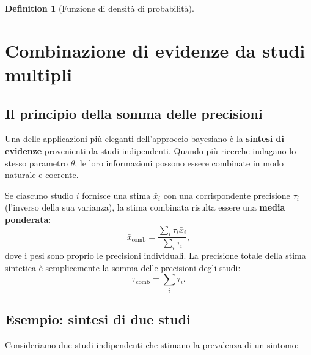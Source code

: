 \documentclass[
  letterpaper,
  DIV=11,
  numbers=noendperiod,
  oneside]{scrreprt}
\newenvironment{Shaded}{\begin{snugshade}}{\end{snugshade}}
\newcommand{\AttributeTok}[1]{\textcolor[rgb]{0.40,0.45,0.13}{#1}}
\newcommand{\CommentTok}[1]{\textcolor[rgb]{0.37,0.37,0.37}{#1}}
\newcommand{\DecValTok}[1]{\textcolor[rgb]{0.68,0.00,0.00}{#1}}
\newcommand{\FloatTok}[1]{\textcolor[rgb]{0.68,0.00,0.00}{#1}}
\newcommand{\FunctionTok}[1]{\textcolor[rgb]{0.28,0.35,0.67}{#1}}
\newcommand{\NormalTok}[1]{\textcolor[rgb]{0.00,0.23,0.31}{#1}}
\newcommand{\OtherTok}[1]{\textcolor[rgb]{0.00,0.23,0.31}{#1}}
\newcommand{\SpecialCharTok}[1]{\textcolor[rgb]{0.37,0.37,0.37}{#1}}
\newcommand{\StringTok}[1]{\textcolor[rgb]{0.13,0.47,0.30}{#1}}
\theoremstyle{definition}
\theoremstyle{plain}
\theoremstyle{definition}
\newtheorem{definition}{Definition}[chapter]
\theoremstyle{remark}
\begin{document}
\begin{definition}[Funzione di densità di
probabilità]
\section{Combinazione di evidenze da studi
multipli}\label{combinazione-di-evidenze-da-studi-multipli}

\subsection{Il principio della somma delle
precisioni}\label{il-principio-della-somma-delle-precisioni}

Una delle applicazioni più eleganti dell'approccio bayesiano è la
\textbf{sintesi di evidenze} provenienti da studi indipendenti. Quando
più ricerche indagano lo stesso parametro \(\theta\), le loro
informazioni possono essere combinate in modo naturale e coerente.

Se ciascuno studio \(i\) fornisce una stima \(\bar{x}_i\) con una
corrispondente precisione \(\tau_i\) (l'inverso della sua varianza), la
stima combinata risulta essere una \textbf{media ponderata}: \[
\bar{x}_{\text{comb}} = \frac{\sum_i \tau_i \bar{x}_i}{\sum_i \tau_i},
\] dove i pesi sono proprio le precisioni individuali. La precisione
totale della stima sintetica è semplicemente la somma delle precisioni
degli studi: \[
\tau_{\text{comb}} = \sum_i \tau_i.
\]

\subsection{Esempio: sintesi di due
studi}\label{esempio-sintesi-di-due-studi}

Consideriamo due studi indipendenti che stimano la prevalenza di un
sintomo:

\begin{Shaded}
\end{Shaded}
\end{definition}
\end{document}
